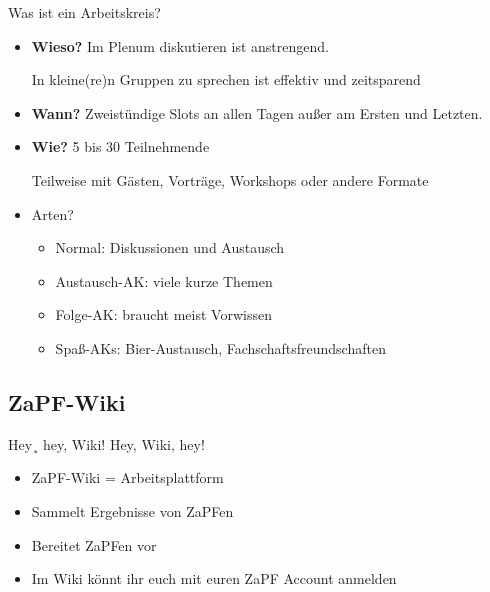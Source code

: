\documentclass[compress,]{beamer}
\begin{document}
\begin{frame}{Was ist ein Arbeitskreis?}

  \begin{itemize}[<+->]
  \item \textbf{Wieso?} Im Plenum diskutieren ist anstrengend.

    In kleine(re)n Gruppen zu sprechen ist effektiv und zeitsparend
  \item \textbf{Wann?} Zweistündige Slots an allen Tagen außer am Ersten und Letzten.
  \item \textbf{Wie?} 5 bis 30 Teilnehmende

    Teilweise mit Gästen, Vorträge, Workshops oder andere Formate

  \item Arten?
    \begin{itemize}[<+->]
    \item \glqq{}Normal\grqq{}: Diskussionen und Austausch
    \item Austausch-AK: viele kurze Themen
    \item Folge-AK: braucht meist Vorwissen
    \item Spaß-AKs: Bier-Austausch, Fachschaftsfreundschaften
    \end{itemize}
  \end{itemize}

\end{frame}


\subsection{ZaPF-Wiki}

\begin{frame}{Hey¸ hey, Wiki! Hey, Wiki, hey!}

\begin{itemize}[<+->]
	\item ZaPF-Wiki = Arbeitsplattform
	\item Sammelt Ergebnisse von ZaPFen
	\item Bereitet ZaPFen vor
	\item Im Wiki könnt ihr euch mit euren ZaPF Account anmelden
\end{itemize}

\end{frame}


\end{document}
